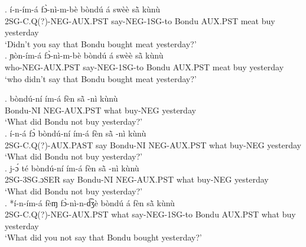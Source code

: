 \documentclass{assets/fieldnotes}
\begin{document}
\exg. í-n-ím-á fɔ̀-nì-m-bè bòndú á swèè sã̀  kùnù\\
2SG-C.Q(?)-NEG-AUX.PST say-NEG-1SG-to Bondu AUX.PST meat buy yesterday\\
`Didn't you say that Bondu bought meat yesterday?' \\

\exg. ɲòn-ím-á fɔ̀-nì-m-bè bòndú á swèè sã̀  kùnù\\
who-NEG-AUX.PST say-NEG-1SG-to Bondu AUX.PST meat buy yesterday\\
`who didn't say that Bondu bought meat yesterday?' \\



\exg. bòndú-ní ím-á fèn sã̀ -nì kùnù\\
Bondu-NI NEG-AUX.PST what buy-NEG yesterday\\
`What did Bondu not buy yesterday?' \\

\exg. í-n-á fɔ̀ bòndú-ní ím-á fèn sã̀ -nì kùnù\\
2SG-C.Q(?)-AUX.PAST say Bondu-NI NEG-AUX.PST what buy-NEG yesterday\\
`What did Bondu not buy yesterday?' \\

\exg. j-ɔ́ té bòndú-ní ím-á fèn sã̀ -nì kùnù\\
2SG-3SG.ɔSER say Bondu-NI NEG-AUX.PST what buy-NEG yesterday\\
`What did Bondu not buy yesterday?' \\

\exg. *í-n-ím-á fèɱ fɔ̀-nì-n-d͡ʒè bòndú á fèn sã̀  kùnù\\
2SG-C.Q(?)-NEG-AUX.PST what say-NEG-1SG-to Bondu AUX.PST what buy yesterday\\
`What did you not say that Bondu bought yesterday?' \\
\end{document}
